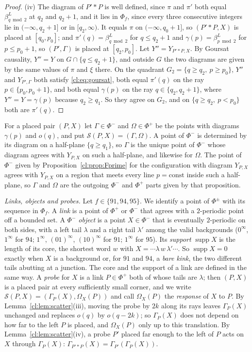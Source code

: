 \begin{proof}
(iv) The diagram of $P'*P$ is well defined, since $\pi$ and $\pi'$ both equal $\beta^L_{q\bmod2}$ at $q_2$ and $q_2+1$, and it lies in $\Phi_f$, since every three consecutive integers lie in $(-\infty,q_2+1]$ or in $[q_2,\infty)$. It equals $\pi$ on $(-\infty,q_0+1]$, so $(P'*P,X)$ is placed at $[q_0,p_0]$; and $\pi'(q)=\beta^L_{q\bmod2}$ for $q\le q_2+1$ and $\gamma(p)=\beta^L_{p\bmod2}$ for $p\le p_0+1$, so $(P',\Gamma)$ is placed at $[q_2,p_0]$. Let $Y''=Y_{P'*P,X}$. By Goursat causality, $Y''=Y$ on $G\cap\{q\le q_2+1\}$, and outside $G$ the two diagrams are given by the same values of $\pi$ and $\xi$ there. On the quadrant $G_2=\{q\ge q_2,\ p\ge p_0\}$, $Y''$ and $Y_{P',\Gamma}$ both satisfy \eqref{cl:eq:goursat}, both equal $\pi'(q)$ on the ray $p\in\{p_0,p_0+1\}$, and both equal $\gamma(p)$ on the ray $q\in\{q_2,q_2+1\}$, where $Y''=Y=\gamma(p)$ because $q_2\ge q_1$. So they agree on $G_2$, and on $\{q\ge q_2,\ p<p_0\}$ both are $\pi'(q)$.
\end{proof}

For a placed pair $(P,X)$ let $\Gamma\in\Phi^-$ and $\Omega\in\Phi^+$ be the points with diagrams $\gamma(p)$ and $o(q)$, and put $\mathcal S(P,X)=(\Gamma,\Omega)$. A point of $\Phi^-$ is determined by its diagram on a half-plane $\{q\ge q_1\}$, so $\Gamma$ is the unique point of $\Phi^-$ whose diagram agrees with $Y_{P,X}$ on such a half-plane, and likewise for $\Omega$. The point of $\Phi^-$ given by Proposition~\ref{cl:prop:Fprime} for the configuration with diagram $Y_{P,X}$ agrees with $Y_{P,X}$ on a region that meets every line $p=\mathrm{const}$ inside such a half-plane, so $\Gamma$ and $\Omega$ are the outgoing $\Phi^-$ and $\Phi^+$ parts given by that proposition.

\emph{Links, objects and probes.} Let $f\in\{91,94,95\}$. We identify a point of $\Phi^\pm$ with its sequence in $\Phi_f$. A \emph{link} is a point of $\Phi^+$ or $\Phi^-$ that agrees with a $2$-periodic point off a bounded set. A \emph{$\Phi^-$ object} is a point $X\in\Phi^-$ that is eventually $2$-periodic on both sides, with a left tail $\lambda$ and a right tail $\lambda'$ among the valid backgrounds ($0^\infty$, $1^\infty$ for $94$; $1^\infty$, $(01)^\infty$, $(10)^\infty$ for $91$; $1^\infty$ for $95$). Its \emph{support} $\operatorname{supp}X$ is the length of its core, the shortest word $w$ with $X=\cdots\lambda\, w\,\lambda'\cdots$. So $\operatorname{supp}X=0$ exactly when $X$ is a background or, for $91$ and $94$, a \emph{bare kink}, the two different tails abutting at a junction. The core and the support of a link are defined in the same way. A \emph{probe} for $X$ is a link $P\in\Phi^+$ both of whose tails are $\lambda$; then $(P,X)$ is a placed pair at every sufficiently small corner, and we write $\mathcal S(P,X)=(\Gamma_P(X),\Omega_X(P))$ and call $\Omega_X(P)$ the \emph{response} of $X$ to $P$. By Lemma~\ref{cl:lem:scatter}(iii), moving the probe by $2k$ along its rays leaves $\Gamma_P(X)$ unchanged and replaces $o(q)$ by $o(q-2k)$; so $\Gamma_P(X)$ does not depend on how far to the left $P$ is placed, and $\Omega_X(P)$ only up to this translation. By Lemma~\ref{cl:lem:scatter}(iv), a probe $P'$ placed far enough to the left of $P$ acts on $X$ through $\Gamma_P(X)$: $\Gamma_{P'*P}(X)=\Gamma_{P'}(\Gamma_P(X))$.

